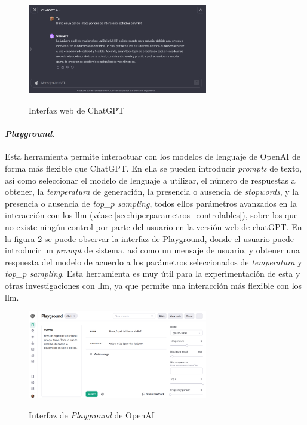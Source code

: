     \begin{figure}[h]
        \caption[Interfaz web de ChatGPT]{Interfaz web de ChatGPT}
        \centering
        \includegraphics[width=0.7\textwidth]{./figuras/interfaz_chatgpt.png}
        \source{\propio}
        \label{fig:chatgpt}
    \end{figure}

    \paragraph{\emph{Playground.}} Esta herramienta permite interactuar con los modelos de lenguaje de OpenAI de forma más flexible que ChatGPT. En ella se pueden introducir \emph{prompts} de texto, así como seleccionar el modelo de lenguaje a utilizar, el número de respuestas a obtener, la \emph{temperatura} de generación, la presencia o ausencia de \emph{stopwords}, y la presencia o ausencia de \emph{top\_p sampling}, todos ellos parámetros avanzados en la interacción con los \gls{llm} (véase \ref{sec:hiperparametros_controlables}), sobre los que no existe ningún control por parte del usuario en la versión web de chatGPT. En la figura \ref{fig:playground} se puede observar la interfaz de Playground, donde el usuario puede introducir un \emph{prompt} de sistema, así como un mensaje de usuario, y obtener una respuesta del modelo de acuerdo a los parámetros seleccionados de \emph{temperatura} y \emph{top\_p sampling}. Esta herramienta es muy útil para la experimentación de esta y otras investigaciones con \gls{llm}, ya que permite una interacción más flexible con los \gls{llm}.

    \begin{figure}[h]
        \caption[Interfaz de \emph{Playground} de OpenAI]{Interfaz de \emph{Playground} de OpenAI}
        \centering
        \includegraphics[width=0.7\textwidth]{./figuras/interfaz_playground.png}
        \source{\propio}
        \label{fig:playground}
    \end{figure}

